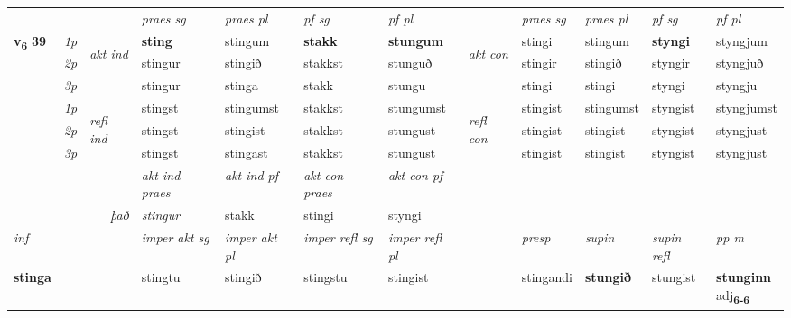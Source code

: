\begin{longtable}[l]{X>{\footnotesize\itshape}llXXXXlXXXX}
 & &   & \textit{praes sg}  & \textit{praes pl}    & \textit{ pf sg} & \textit{pf pl} & & \textit{praes sg}  & \textit{praes pl}    & \textit{pf sg} & \textit{pf pl }  \\ \cmidrule{4-7} \cmidrule{9-12}
 \multirow{2}{*}{{{\textbf{v{\textsubscript{6}}} \Large{\textbf{39}}}}}  & 1p & \multirow{3}{*}{\begin{turn}{90}\textit{akt ind}\end{turn}} & \textbf{sting} & stingum & \textbf{stakk} & \textbf{stungum} & \multirow{3}{*}{\begin{turn}{90}\textit{akt con}\end{turn}} &stingi & stingum & \textbf{styngi} & styngjum\\*
 & 2p &  &  stingur  & stingið & stakkst & stunguð & & stingir & stingið & styngir & styngjuð \\*
 & 3p &  & stingur & stinga & stakk & stungu & & stingi & stingi& styngi & styngju \\*
\cmidrule{4-7} \cmidrule{9-12}
 & 1p & \multirow{3}{*}{\begin{turn}{90}\textit{refl ind}\end{turn}}  & stingst & stingumst & stakkst & stungumst & \multirow{3}{*}{\begin{turn}{90}\textit{refl con}\end{turn}}  &stingist & stingumst & styngist & styngjumst \\*
 & 2p &  & stingst & stingist & stakkst & stungust & &stingist & stingist & styngist & styngjust \\*
 & 3p  & & stingst & stingast & stakkst & stungust & & stingist & stingist& styngist & styngjust \\*
\cmidrule{4-7} \cmidrule{9-12}

   && &  \textit{akt ind praes} & \textit{akt ind pf} & \textit{akt con praes} & \textit{akt con pf} \\*
\multicolumn{3}{r}{\textit{það}} & stingur & stakk & stingi & styngi \\*

\cmidrule{4-7}
   {\textit{inf}} & &  & \textit{imper akt sg} & \textit{imper akt pl} & \textit{imper refl sg} & \textit{imper refl pl} && \textit{presp} & \textit{supin} & \textit{supin refl} & \textit{pp m} \\*
  {\textbf{stinga}} & && stingtu  & stingið & stingstu & stingist && stingandi &  \textbf{stungið} & stungist & \specialcell{\textbf{stunginn} \\ adj\textbf{\textsubscript{6-6}}} \\*


\end{longtable}

